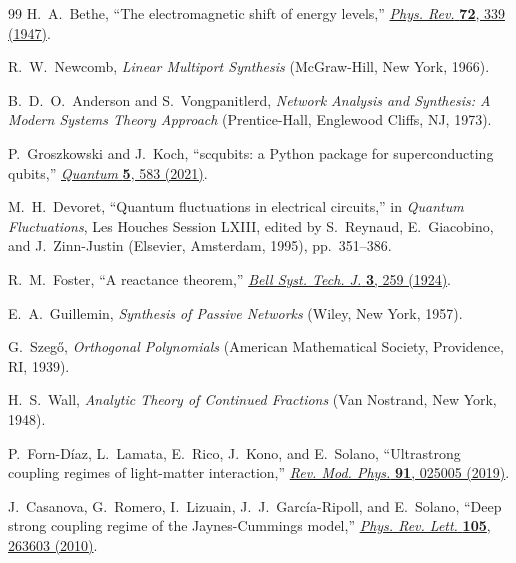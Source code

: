 \documentclass[reprint, floatfix, superscriptaddress, amsmath, amssymb, longbibliography]{revtex4-2}
\begin{document}
\begin{thebibliography}{99}
H.~A.~Bethe, ``The electromagnetic shift of energy levels,'' 
\href{https://doi.org/10.1103/PhysRev.72.339}{\textit{Phys. Rev.} \textbf{72}, 339 (1947)}.

R.~W.~Newcomb,
\textit{Linear Multiport Synthesis}
(McGraw-Hill, New York, 1966).

B.~D.~O.~Anderson and S.~Vongpanitlerd,
\textit{Network Analysis and Synthesis: A Modern Systems Theory Approach}
(Prentice-Hall, Englewood Cliffs, NJ, 1973).

P.~Groszkowski and J.~Koch, ``scqubits: a Python package for superconducting qubits,''
\href{https://doi.org/10.22331/q-2021-11-17-583}{\textit{Quantum} \textbf{5}, 583 (2021)}.

M.~H.~Devoret, ``Quantum fluctuations in electrical circuits,'' 
in \textit{Quantum Fluctuations}, Les Houches Session LXIII, edited by S.~Reynaud, E.~Giacobino, and J.~Zinn-Justin
(Elsevier, Amsterdam, 1995), pp.~351--386.

R.~M.~Foster, ``A reactance theorem,'' 
\href{https://doi.org/10.1002/j.1538-7305.1924.tb01358.x}{\textit{Bell Syst. Tech. J.} \textbf{3}, 259 (1924)}.

E.~A.~Guillemin,
\textit{Synthesis of Passive Networks}
(Wiley, New York, 1957).

G.~Szeg\H{o},
\textit{Orthogonal Polynomials}
(American Mathematical Society, Providence, RI, 1939).

H.~S.~Wall,
\textit{Analytic Theory of Continued Fractions}
(Van Nostrand, New York, 1948).

P.~Forn-D\'{i}az, L.~Lamata, E.~Rico, J.~Kono, and E.~Solano,
``Ultrastrong coupling regimes of light-matter interaction,''
\href{https://doi.org/10.1103/RevModPhys.91.025005}{\textit{Rev. Mod. Phys.} \textbf{91}, 025005 (2019)}.

J.~Casanova, G.~Romero, I.~Lizuain, J.~J.~Garc{\'i}a-Ripoll, and E.~Solano,
``Deep strong coupling regime of the Jaynes-Cummings model,''
\href{https://doi.org/10.1103/PhysRevLett.105.263603}{\textit{Phys. Rev. Lett.} \textbf{105}, 263603 (2010)}.


\end{thebibliography}
\end{document}
